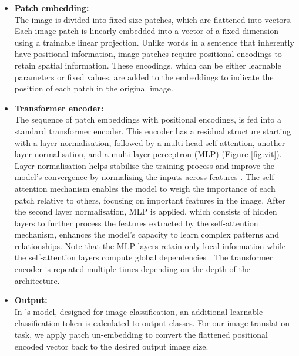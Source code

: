 \begin{itemize}
	\item \textbf{Patch embedding:}
	\\
	\noindent The image is divided into fixed-size patches, which are flattened into vectors. Each image patch is linearly embedded into a vector of a fixed dimension using a trainable linear projection. Unlike words in a sentence that inherently have positional information, image patches require positional encodings to retain spatial information. These encodings, which can be either learnable parameters or fixed values, are added to the embeddings to indicate the position of each patch in the original image.
	\item \textbf{Transformer encoder:}
	\\
	\noindent The sequence of patch embeddings with positional encodings, is fed into a standard transformer encoder. This encoder has a residual structure starting with a layer normalisation, followed by a multi-head self-attention, another layer normalisation, and a multi-layer perceptron (MLP) (Figure \ref{fig:vit}). Layer normalisation helps stabilise the training process and improve the model's convergence by normalising the inputs across features \cite{xu2019understanding}. The self-attention mechanism enables the model to weigh the importance of each patch relative to others, focusing on important features in the image. After the second layer normalisation, MLP is applied, which consists of hidden layers to further process the features extracted by the self-attention mechanism, enhances the model's capacity to learn complex patterns and relationships. Note that the MLP layers retain only local information while the self-attention layers compute global dependencies \cite{dosovitskiy2020image}. The transformer encoder is repeated multiple times depending on the depth of the architecture.
	\item \textbf{Output:}
	\\
	\noindent In \citeauthor{dosovitskiy2020image}'s model, designed for image classification, an additional learnable classification token is calculated to output classes. For our image translation task, we apply patch un-embedding to convert the flattened positional encoded vector back to the desired output image size.
\end{itemize}

